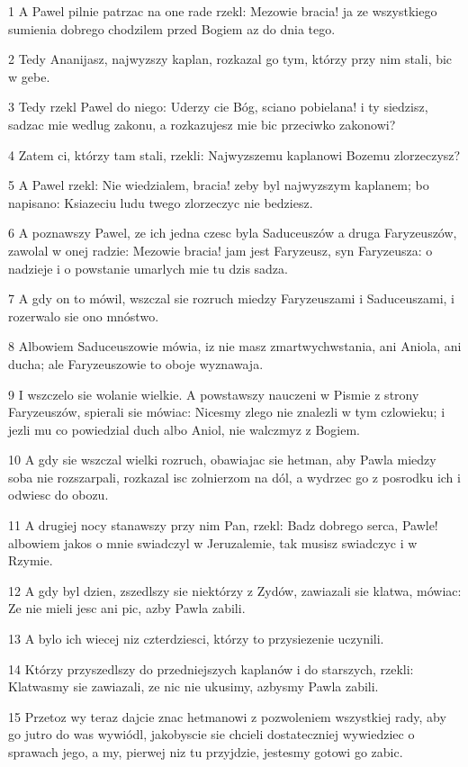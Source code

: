 \par 1 A Pawel pilnie patrzac na one rade rzekl: Mezowie bracia! ja ze wszystkiego sumienia dobrego chodzilem przed Bogiem az do dnia tego.
\par 2 Tedy Ananijasz, najwyzszy kaplan, rozkazal go tym, którzy przy nim stali, bic w gebe.
\par 3 Tedy rzekl Pawel do niego: Uderzy cie Bóg, sciano pobielana! i ty siedzisz, sadzac mie wedlug zakonu, a rozkazujesz mie bic przeciwko zakonowi?
\par 4 Zatem ci, którzy tam stali, rzekli: Najwyzszemu kaplanowi Bozemu zlorzeczysz?
\par 5 A Pawel rzekl: Nie wiedzialem, bracia! zeby byl najwyzszym kaplanem; bo napisano: Ksiazeciu ludu twego zlorzeczyc nie bedziesz.
\par 6 A poznawszy Pawel, ze ich jedna czesc byla Saduceuszów a druga Faryzeuszów, zawolal w onej radzie: Mezowie bracia! jam jest Faryzeusz, syn Faryzeusza: o nadzieje i o powstanie umarlych mie tu dzis sadza.
\par 7 A gdy on to mówil, wszczal sie rozruch miedzy Faryzeuszami i Saduceuszami, i rozerwalo sie ono mnóstwo.
\par 8 Albowiem Saduceuszowie mówia, iz nie masz zmartwychwstania, ani Aniola, ani ducha; ale Faryzeuszowie to oboje wyznawaja.
\par 9 I wszczelo sie wolanie wielkie. A powstawszy nauczeni w Pismie z strony Faryzeuszów, spierali sie mówiac: Nicesmy zlego nie znalezli w tym czlowieku; i jezli mu co powiedzial duch albo Aniol, nie walczmyz z Bogiem.
\par 10 A gdy sie wszczal wielki rozruch, obawiajac sie hetman, aby Pawla miedzy soba nie rozszarpali, rozkazal isc zolnierzom na dól, a wydrzec go z posrodku ich i odwiesc do obozu.
\par 11 A drugiej nocy stanawszy przy nim Pan, rzekl: Badz dobrego serca, Pawle! albowiem jakos o mnie swiadczyl w Jeruzalemie, tak musisz swiadczyc i w Rzymie.
\par 12 A gdy byl dzien, zszedlszy sie niektórzy z Zydów, zawiazali sie klatwa, mówiac: Ze nie mieli jesc ani pic, azby Pawla zabili.
\par 13 A bylo ich wiecej niz czterdziesci, którzy to przysiezenie uczynili.
\par 14 Którzy przyszedlszy do przedniejszych kaplanów i do starszych, rzekli: Klatwasmy sie zawiazali, ze nic nie ukusimy, azbysmy Pawla zabili.
\par 15 Przetoz wy teraz dajcie znac hetmanowi z pozwoleniem wszystkiej rady, aby go jutro do was wywiódl, jakobyscie sie chcieli dostateczniej wywiedziec o sprawach jego, a my, pierwej niz tu przyjdzie, jestesmy gotowi go zabic.
